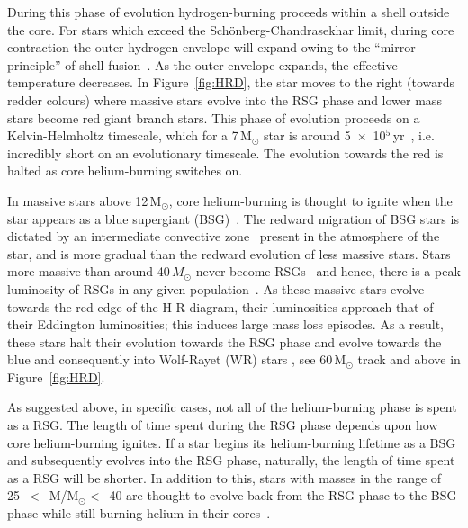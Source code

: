 During this phase of evolution hydrogen-burning proceeds within a shell outside the core.
For stars which exceed the Sch\"onberg-Chandrasekhar limit, during core contraction the outer hydrogen envelope will expand owing to the ``mirror principle'' of shell fusion~\citep[e.g.][]{2012MNRAS.421.2713B}.\footnotemark
As the outer envelope expands, the effective temperature decreases.
In Figure~\ref{fig:HRD}, the star moves to the right (towards redder colours) where massive stars evolve into the RSG phase and lower mass stars become red giant branch stars.
This phase of evolution proceeds on a Kelvin-Helmholtz timescale, which for a 7\,M$_{\odot}$ star is around 5~$\times$~10$^{5}$\,yr~\citep{2012sse..book.....K}, i.e. incredibly short on an evolutionary timescale.
The evolution towards the red is halted as core helium-burning switches on.


In massive stars above 12\,M$_{\odot}$, core helium-burning is thought to ignite when the star appears as a blue supergiant (BSG)~\citep{Meynet11,2012A&A...537A.146E,Langer12,Saio13}.
The redward migration of BSG stars is dictated by an intermediate convective zone~\citep{Meynet11} present in the atmosphere of the star, and is more gradual than the redward evolution of less massive stars.
Stars more massive than around 40\,$M_{\odot}$ never become RSGs~\citep{Massey03,Meynet11,2012A&A...537A.146E} and hence, there is a peak luminosity of RSGs in any given population~\citep{1979ApJ...232..409H}.
As these massive stars evolve towards the red edge of the H-R diagram, their luminosities approach that of their Eddington luminosities; this induces large mass loss episodes.
As a result, these stars halt their evolution towards the RSG phase and evolve towards the blue and consequently into Wolf-Rayet (WR) stars
\citep{2007ARA&A..45..177C, Vink09}, see 60\,M$_{\odot}$ track and above in Figure~\ref{fig:HRD}.

As suggested above, in specific cases, not all of the helium-burning phase is spent as a RSG.
The length of time spent during the RSG phase depends upon how core helium-burning ignites.
If a star begins its helium-burning lifetime as a BSG and subsequently evolves into the RSG phase, naturally, the length of time spent as a RSG will be shorter.
In addition to this, stars with masses in the range of 25~$<$~M/M$_{\odot}<$~40 are thought to evolve back from the RSG phase to the BSG phase while still burning helium in their cores~\citep{2012A&A...537A.146E}.

